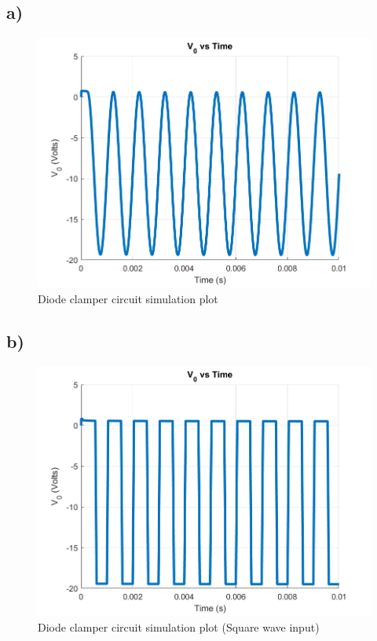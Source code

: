 \documentclass[letterpaper,12pt]{article}
\begin{document}
\subsection{a)}
\begin{figure}[H]
    \centering
   \includegraphics[width=1\textwidth]{5a.png}
   \caption{Diode clamper circuit simulation plot}
\end{figure} 
\subsection{b)}
\begin{figure}[H]
    \centering
   \includegraphics[width=1\textwidth]{5b.png}
   \caption{Diode clamper circuit simulation plot (Square wave input)}
\end{figure} 
\end{document}
